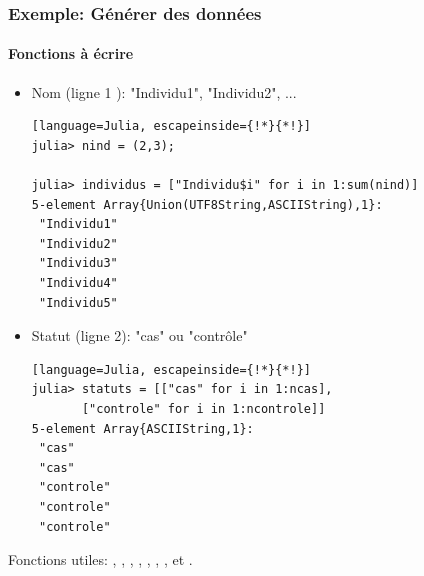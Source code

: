\begin{frame}[fragile]
    \frametitle{\textcolor{goldenrod2}{Exemple:} Générer des données}
    \framesubtitle{Fonctions à écrire}
    \begin{description}
            \begin{itemize}
                \item Nom (ligne 1 ): "Individu1", "Individu2", ...
\begin{lstlisting}[language=Julia, escapeinside={!*}{*!}]
julia> nind = (2,3);

julia> individus = ["Individu$i" for i in 1:sum(nind)]
5-element Array{Union(UTF8String,ASCIIString),1}:
 "Individu1"
 "Individu2"
 "Individu3"
 "Individu4"
 "Individu5"
\end{lstlisting}

                \item Statut (ligne 2): "cas" ou "contrôle"
\begin{lstlisting}[language=Julia, escapeinside={!*}{*!}]
julia> statuts = [["cas" for i in 1:ncas],
       ["controle" for i in 1:ncontrole]]
5-element Array{ASCIIString,1}:
 "cas"
 "cas"
 "controle"
 "controle"
 "controle"
\end{lstlisting}
            \end{itemize}
    \end{description}
    \par{Fonctions utiles: , , , , , , , \cmdb{\textquotesingle} et .}
\end{frame}


